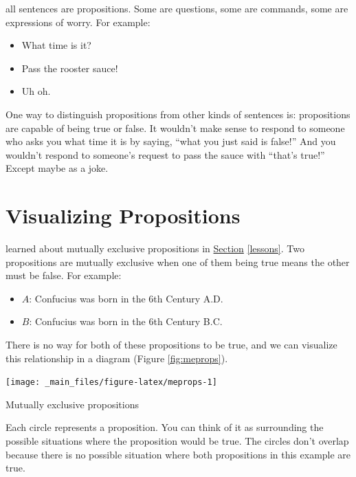 \documentclass[justified]{tufte-book}
\providecommand{\tightlist}{%
  \setlength{\itemsep}{0pt}\setlength{\parskip}{0pt}}
\begin{document}
 all sentences are propositions. Some are questions, some are commands, some are expressions of worry. For example:

\begin{itemize}
\tightlist
\item
  What time is it?
\item
  Pass the rooster sauce!
\item
  Uh oh.
\end{itemize}

One way to distinguish propositions from other kinds of sentences is: propositions are capable of being true or false. It wouldn't make sense to respond to someone who asks you what time it is by saying, ``what you just said is false!'' And you wouldn't respond to someone's request to pass the sauce with ``that's true!'' Except maybe as a joke.

\hypertarget{visualizing-propositions}{%
\section{Visualizing Propositions}\label{visualizing-propositions}}

 learned about mutually exclusive propositions in \protect\hyperlink{lessons}{Section} \ref{lessons}. Two propositions are mutually exclusive when one of them being true means the other must be false. For example:

\begin{itemize}
\tightlist
\item
  \(A\): Confucius was born in the 6th Century A.D.
\item
  \(B\): Confucius was born in the 6th Century B.C.
\end{itemize}

There is no way for both of these propositions to be true, and we can visualize this relationship in a diagram (Figure \ref{fig:meprops}).

\begin{marginfigure}
\texttt{[image: \_main\_files/figure-latex/meprops-1]} \caption[Mutually exclusive propositions]{Mutually exclusive propositions}\label{fig:meprops}
\end{marginfigure}

Each circle represents a proposition. You can think of it as surrounding the possible situations where the proposition would be true. The circles don't overlap because there is no possible situation where both propositions in this example are true.
\end{document}
